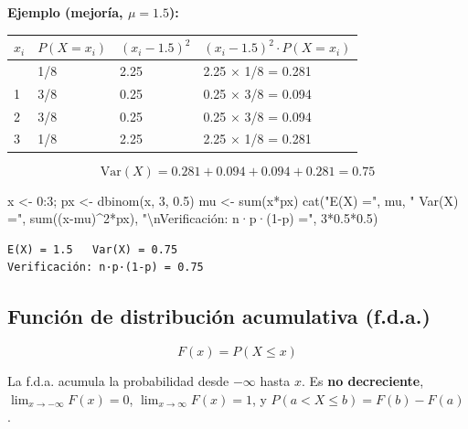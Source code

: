 \documentclass[
  letterpaper,
  DIV=11,
  numbers=noendperiod]{scrartcl}
\newenvironment{Shaded}{\begin{snugshade}}{\end{snugshade}}
\newcommand{\DecValTok}[1]{\textcolor[rgb]{0.68,0.00,0.00}{#1}}
\newcommand{\FloatTok}[1]{\textcolor[rgb]{0.68,0.00,0.00}{#1}}
\newcommand{\FunctionTok}[1]{\textcolor[rgb]{0.28,0.35,0.67}{#1}}
\newcommand{\NormalTok}[1]{\textcolor[rgb]{0.00,0.23,0.31}{#1}}
\newcommand{\OtherTok}[1]{\textcolor[rgb]{0.00,0.23,0.31}{#1}}
\newcommand{\SpecialCharTok}[1]{\textcolor[rgb]{0.37,0.37,0.37}{#1}}
\newcommand{\StringTok}[1]{\textcolor[rgb]{0.13,0.47,0.30}{#1}}
\newcounter{none} %
\begin{document}
\textbf{Ejemplo (mejoría, \(\mu = 1.5\)):}

{\def\LTcaptype{none} %
\begin{longtable}[]{@{}llll@{}}
\toprule\noalign{}
\(x_i\) & \(P(X=x_i)\) & \((x_i - 1.5)^2\) &
\((x_i-1.5)^2 \cdot P(X=x_i)\) \\
\midrule\noalign{}
\endhead
\bottomrule\noalign{}
\endlastfoot
0 & 1/8 & 2.25 & 2.25 × 1/8 = 0.281 \\
1 & 3/8 & 0.25 & 0.25 × 3/8 = 0.094 \\
2 & 3/8 & 0.25 & 0.25 × 3/8 = 0.094 \\
3 & 1/8 & 2.25 & 2.25 × 1/8 = 0.281 \\
\end{longtable}
}

\[\text{Var}(X) = 0.281+0.094+0.094+0.281 = 0.75\]

\begin{Shaded}
\begin{Highlighting}[]
\NormalTok{x }\OtherTok{\textless{}{-}} \DecValTok{0}\SpecialCharTok{:}\DecValTok{3}\NormalTok{; px }\OtherTok{\textless{}{-}} \FunctionTok{dbinom}\NormalTok{(x, }\DecValTok{3}\NormalTok{, }\FloatTok{0.5}\NormalTok{)}
\NormalTok{mu }\OtherTok{\textless{}{-}} \FunctionTok{sum}\NormalTok{(x}\SpecialCharTok{*}\NormalTok{px)}
\FunctionTok{cat}\NormalTok{(}\StringTok{"E(X) ="}\NormalTok{, mu, }\StringTok{"  Var(X) ="}\NormalTok{, }\FunctionTok{sum}\NormalTok{((x}\SpecialCharTok{{-}}\NormalTok{mu)}\SpecialCharTok{\^{}}\DecValTok{2}\SpecialCharTok{*}\NormalTok{px),}
    \StringTok{"}\SpecialCharTok{\textbackslash{}n}\StringTok{Verificación: n·p·(1{-}p) ="}\NormalTok{, }\DecValTok{3}\SpecialCharTok{*}\FloatTok{0.5}\SpecialCharTok{*}\FloatTok{0.5}\NormalTok{)}
\end{Highlighting}
\end{Shaded}

\begin{verbatim}
E(X) = 1.5   Var(X) = 0.75 
Verificación: n·p·(1-p) = 0.75
\end{verbatim}

\subsection{Función de distribución acumulativa
(f.d.a.)}\label{funcion-de-distribucion-acumulativa-f.d.a.}

\begin{tcolorbox}[enhanced jigsaw, arc=.35mm, bottomrule=.15mm, bottomtitle=1mm, breakable, colback=white, colbacktitle=quarto-callout-note-color!10!white, colframe=quarto-callout-note-color-frame, coltitle=black, left=2mm, leftrule=.75mm, opacityback=0, opacitybacktitle=0.6, rightrule=.15mm, title=\textcolor{quarto-callout-note-color}{\faInfo}\hspace{0.5em}{Note}, titlerule=0mm, toprule=.15mm, toptitle=1mm]

\[F(x) = P(X \leq x)\]

La f.d.a. acumula la probabilidad desde \(-\infty\) hasta \(x\). Es
\textbf{no decreciente}, \(\lim_{x\to-\infty}F(x)=0\),
\(\lim_{x\to\infty}F(x)=1\), y \(P(a < X \leq b) = F(b) - F(a)\).

\end{tcolorbox}
\end{document}
